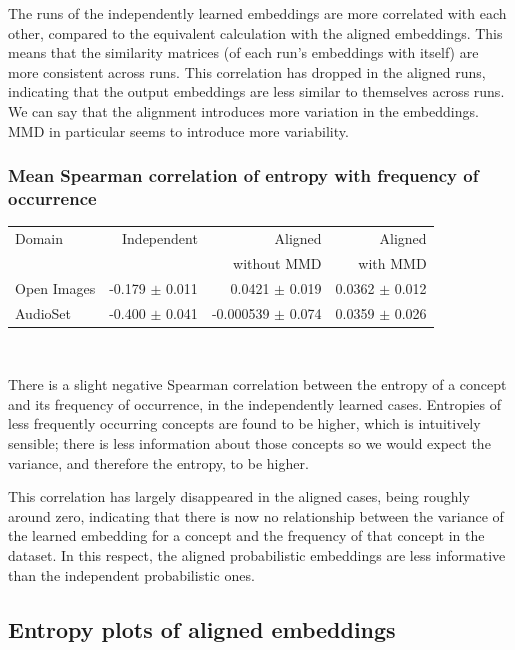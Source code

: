 The runs of the independently learned embeddings are more correlated with each other, compared to the equivalent calculation with the aligned embeddings. This means that the similarity matrices (of each run's embeddings with itself) are more consistent across runs. This correlation has dropped in the aligned runs, indicating that the output embeddings are less similar to themselves across runs. We can say that the alignment introduces more variation in the embeddings. MMD in particular seems to introduce more variability. 

\subsubsection{Mean Spearman correlation of entropy with frequency of occurrence}
\begin{table}[H]
\centering
\begin{tabular}{lrrr}
\toprule
Domain &   Independent & Aligned     &  Aligned  \\
       &               & without MMD &  with MMD \\
\midrule
Open Images    &  -0.179 $\pm$ 0.011 & 0.0421 $\pm$ 0.019 &     0.0362 $\pm$  0.012 \\
AudioSet    &  -0.400 $\pm$ 0.041 & -0.000539 $\pm$   0.074 &      0.0359  $\pm$ 0.026  \\
\bottomrule
\end{tabular}\\
\end{table}
There is a slight negative Spearman correlation between the entropy of a concept and its frequency of occurrence, in the independently learned cases. Entropies of less frequently occurring concepts are found to be higher, which is intuitively sensible; there is less information about those concepts so we would expect the variance, and therefore the entropy, to be higher. 

This correlation has largely disappeared in the aligned cases, being roughly around zero, indicating that there is now no relationship between the variance of the learned embedding for a concept and the frequency of that concept in the dataset. In this respect, the aligned probabilistic embeddings are less informative than the independent probabilistic ones. 

\subsection{Entropy plots of aligned embeddings}

